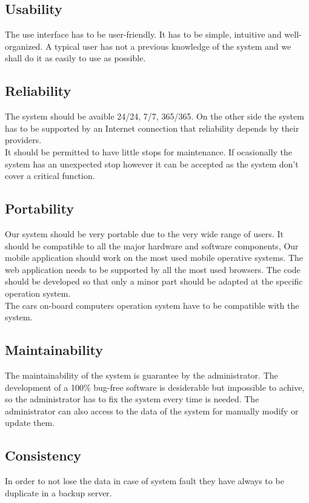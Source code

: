 \subsection{Usability}
\label{sec:usability}
 The use interface has to be user-friendly. It has to be simple, intuitive and well-organized. A typical user has not a previous knowledge of the system and we shall do it as easily to use as possible.

\subsection{Reliability}
The system should be avaible 24/24, 7/7, 365/365. On the other side the system has to be supported by an Internet connection that reliability depends by their providers.  
\\It should be permitted to have little stops for maintenance. If ocasionally the system has an unexpected stop however it can be accepted as the system don't cover a critical function. 

\subsection{Portability}
Our system should be very portable due to the very wide range of users. It should be compatible to all the major hardware and software components, Our mobile application should work on the most used mobile operative systems. The web application needs to be supported by all the most used browsers. The code should be developed so that only a minor part should be adapted at the specific operation system.
\\The cars on-board computers operation system have to be compatible with the system. %

\subsection{Maintainability}
The maintainability of the system is guarantee by the administrator. The development of a 100\% bug-free software is desiderable but impossible to achive, so the administrator has to fix the system every time is needed. The administrator can also access to the data of the system for manually modify or update them.

\subsection{Consistency}
In order to not lose the data in case of system fault they have always to be duplicate in a backup server.  

